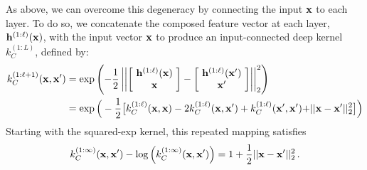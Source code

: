As above, we can overcome this degeneracy by connecting the input ${\bf{x}}$ to each layer.
To do so, we concatenate the composed feature vector at each layer, ${\bf{h}}^{(1:\ell)}({\bf{x}})$, with the input vector ${\bf{x}}$ to produce an input-connected deep kernel $k_C^{(1:L)}$, defined by:
%
\begin{align}
k_C^{(1:\ell + 1)}({\bf{x}}, {\bf{x}}')
& = \exp \left( -\frac{1}{2} \left|\left| 
\left[ \! \begin{array}{c} {\bf{h}}^{(1:\ell)}({\bf{x}}) \\ {\bf{x}} \end{array} \! \right] - 
\left[ \! \begin{array}{c} {\bf{h}}^{(1:\ell)}({\bf{x}}') \\ {\bf{x}}' \end{array} \! \right] \right| \right|_2^2 \right) \\
& = \exp \Big( -\frac{1}{2} \big[ k_C^{(1:\ell)}({\bf{x}}, {\bf{x}}) - 2 k_C^{(1:\ell)}({\bf{x}}, {\bf{x}}') 
 + k_C^{(1:\ell)}({\bf{x}}', {\bf{x}}') {\color{black} + || {\bf{x}} - {\bf{x}}' ||_2^2} \big] \Big) \nonumber
\end{align}
%
Starting with the squared-exp kernel, this repeated mapping satisfies
\begin{align}
k_C^{(1:\infty)}({\bf{x}}, {\bf{x}}') - \log \left( k_C^{(1:\infty)}({\bf{x}}, {\bf{x}}') \right) = 1 + \frac{1}{2} || {\bf{x}} - {\bf{x}}' ||_2^2 \,.
\end{align}
%
